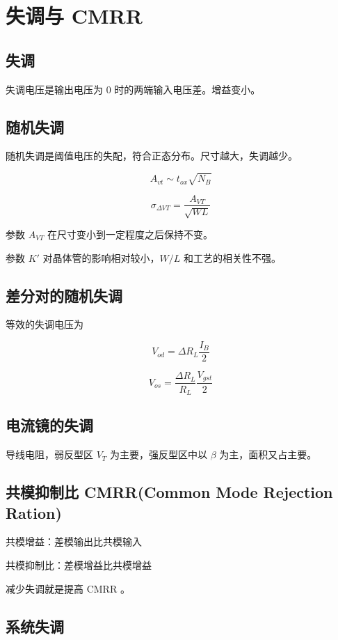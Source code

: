\documentclass[cn,11pt,chinese,black,simple]{../elegantbook}
\begin{document}
\fi 
\def\chapname{04cmrr}

\chapter{失调与 CMRR}

\section{失调}

失调电压是输出电压为 0 时的两端输入电压差。增益变小。

\section{随机失调}

随机失调是阈值电压的失配，符合正态分布。尺寸越大，失调越少。

\[A_{vt} \sim t_{ox}\sqrt{N_B}\]


\[\sigma _{\Delta VT} = \frac{A_{VT}}{\sqrt{WL}}\]

参数 \(A_{VT}\) 在尺寸变小到一定程度之后保持不变。

参数 \(K'\) 对晶体管的影响相对较小，\(W/L\) 和工艺的相关性不强。

\section{差分对的随机失调}

等效的失调电压为 

\[V_{od} = \Delta R_L \frac{I_B}{2}\]
    
\[V_{os} = \frac{\Delta R_L }{R_L}\frac{V_{gst}}{2}\]

\section{电流镜的失调}

导线电阻，弱反型区 \(V_T\) 为主要，强反型区中以 \(\beta\) 为主，面积又占主要。

\section{共模抑制比 CMRR({Common Mode Rejection Ration})}

共模增益：差模输出比共模输入

共模抑制比：差模增益比共模增益

减少失调就是提高 CMRR 。

\section{系统失调}
\end{document}
